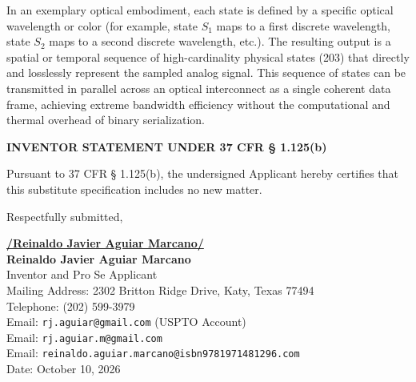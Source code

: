 \documentclass[11pt,letterpaper]{article}
\begin{document}
In an exemplary optical embodiment, each state is defined by a specific optical wavelength or color (for example, state $S_1$ maps to a first discrete wavelength, state $S_2$ maps to a second discrete wavelength, etc.). The resulting output is a spatial or temporal sequence of high-cardinality physical states (203) that directly and losslessly represent the sampled analog signal. This sequence of states can be transmitted in parallel across an optical interconnect as a single coherent data frame, achieving extreme bandwidth efficiency without the computational and thermal overhead of binary serialization.

\vspace{0.8cm}
\begin{center}
    \textbf{\large INVENTOR STATEMENT UNDER 37 CFR \S{} 1.125(b)}
\end{center}

Pursuant to 37 CFR \S{} 1.125(b), the undersigned Applicant hereby certifies that this substitute specification includes no new matter.

\vspace{0.6cm}
\begin{singlespace}
\noindent Respectfully submitted, \par\vspace{0.8cm}
\underline{\textbf{/Reinaldo Javier Aguiar Marcano/}} \\
\textbf{Reinaldo Javier Aguiar Marcano} \\
Inventor and Pro Se Applicant \\
Mailing Address: 2302 Britton Ridge Drive, Katy, Texas 77494 \\
Telephone: (202) 599-3979 \\
Email: \texttt{rj.aguiar@gmail.com} (USPTO Account) \\
Email: \texttt{rj.aguiar.m@gmail.com} \\
Email: \texttt{reinaldo.aguiar.marcano@isbn9781971481296.com} \\
Date: October 10, 2026
\end{singlespace}
\end{document}

